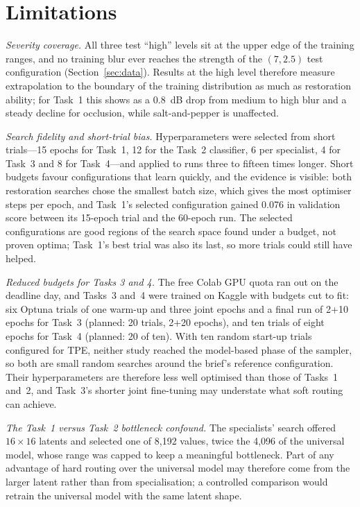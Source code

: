 \documentclass[conference]{IEEEtran}
\begin{document}
\section{Limitations}
\label{sec:limitations}

\emph{Severity coverage.} All three test ``high'' levels sit at the upper edge of
the training ranges, and no training blur ever reaches the strength of the
$(7, 2.5)$ test configuration (Section~\ref{sec:data}). Results at the high
level therefore measure extrapolation to the boundary of the training
distribution as much as restoration ability; for Task~1 this shows as a 0.8~dB
drop from medium to high blur and a steady decline for occlusion, while
salt-and-pepper is unaffected.

\emph{Search fidelity and short-trial bias.} Hyperparameters were selected from
short trials---15 epochs for Task~1, 12 for the Task~2 classifier, 6 per
specialist, 4 for Task~3 and 8 for Task~4---and applied to runs three to fifteen
times longer. Short budgets favour configurations that learn quickly, and the
evidence is visible: both restoration searches chose the smallest batch size,
which gives the most optimiser steps per epoch, and Task~1's selected
configuration gained 0.076 in validation score between its 15-epoch trial and
the 60-epoch run. The selected configurations are good regions of the search
space found under a budget, not proven optima; Task~1's best trial was also its
last, so more trials could still have helped.

\emph{Reduced budgets for Tasks 3 and 4.} The free Colab GPU quota ran out on the
deadline day, and Tasks~3 and~4 were trained on Kaggle with budgets cut to fit:
six Optuna trials of one warm-up and three joint epochs and a final run of
2+10 epochs for Task~3 (planned: 20 trials, 2+20 epochs), and ten trials of eight
epochs for Task~4 (planned: 20 of ten). With ten random start-up trials
configured for TPE, neither study reached the model-based phase of the sampler,
so both are small random searches around the brief's reference configuration.
Their hyperparameters are therefore less well optimised than those of Tasks~1
and~2, and Task~3's shorter joint fine-tuning may understate what soft routing
can achieve.

\emph{The Task~1 versus Task~2 bottleneck confound.} The specialists' search
offered $16\times16$ latents and selected one of 8{,}192 values, twice the 4{,}096
of the universal model, whose range was capped to keep a meaningful bottleneck.
Part of any advantage of hard routing over the universal model may therefore come
from the larger latent rather than from specialisation; a controlled comparison
would retrain the universal model with the same latent shape.
\end{document}
